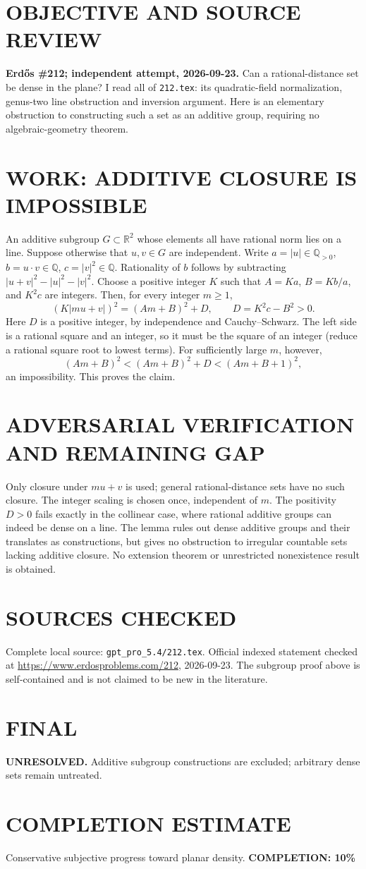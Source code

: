 \section{OBJECTIVE AND SOURCE REVIEW}
\textbf{Erd\H{o}s \#212; independent attempt, 2026-09-23.}
Can a rational-distance set be dense in the plane? I read all of \texttt{212.tex}: its quadratic-field normalization, genus-two line obstruction and inversion argument. Here is an elementary obstruction to constructing such a set as an additive group, requiring no algebraic-geometry theorem.
\section{WORK: ADDITIVE CLOSURE IS IMPOSSIBLE}
An additive subgroup $G\subset\mathbb R^2$ whose elements all have rational norm lies on a line. Suppose otherwise that $u,v\in G$ are independent. Write $a=|u|\in\mathbb Q_{>0}$, $b=u\cdot v\in\mathbb Q$, $c=|v|^2\in\mathbb Q$. Rationality of $b$ follows by subtracting $|u+v|^2-|u|^2-|v|^2$.
Choose a positive integer $K$ such that $A=Ka$, $B=Kb/a$, and $K^2c$ are integers. Then, for every integer $m\ge1$,
\[
(K|mu+v|)^2=(Am+B)^2+D,\qquad
D=K^2c-B^2>0.
\]
Here $D$ is a positive integer, by independence and Cauchy--Schwarz. The left side is a rational square and an integer, so it must be the square of an integer (reduce a rational square root to lowest terms). For sufficiently large $m$, however,
\[
(Am+B)^2<(Am+B)^2+D<(Am+B+1)^2,
\]
an impossibility. This proves the claim.
\section{ADVERSARIAL VERIFICATION AND REMAINING GAP}
Only closure under $mu+v$ is used; general rational-distance sets have no such closure. The integer scaling is chosen once, independent of $m$. The positivity $D>0$ fails exactly in the collinear case, where rational additive groups can indeed be dense on a line. The lemma rules out dense additive groups and their translates as constructions, but gives no obstruction to irregular countable sets lacking additive closure. No extension theorem or unrestricted nonexistence result is obtained.
\section{SOURCES CHECKED}
Complete local source: \texttt{gpt\_pro\_5.4/212.tex}. Official indexed statement checked at \url{https://www.erdosproblems.com/212}, 2026-09-23. The subgroup proof above is self-contained and is not claimed to be new in the literature.
\section{FINAL}
\textbf{UNRESOLVED.} Additive subgroup constructions are excluded; arbitrary dense sets remain untreated.
\section{COMPLETION ESTIMATE}
Conservative subjective progress toward planar density.
\textbf{COMPLETION: 10\%}
